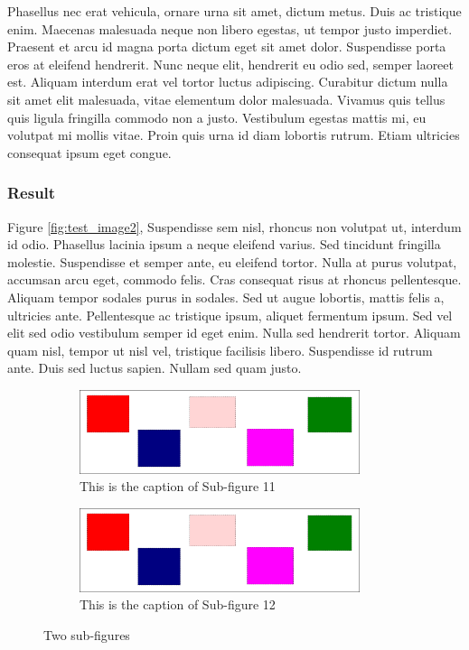Phasellus nec erat vehicula, ornare urna sit amet, dictum metus. Duis ac
tristique enim. Maecenas malesuada neque non libero egestas, ut tempor justo
imperdiet. Praesent et arcu id magna porta dictum eget sit amet dolor.
Suspendisse porta eros at eleifend hendrerit. Nunc neque elit, hendrerit eu
odio sed, semper laoreet est. Aliquam interdum erat vel tortor luctus
adipiscing. Curabitur dictum nulla sit amet elit malesuada, vitae elementum
dolor malesuada. Vivamus quis tellus quis ligula fringilla commodo non a justo.
Vestibulum egestas mattis mi, eu volutpat mi mollis vitae. Proin quis urna id
diam lobortis rutrum. Etiam ultricies consequat ipsum eget congue.

\subsubsection{Result}
Figure \ref{fig:test_image2}, Suspendisse sem nisl, rhoncus non volutpat ut,
interdum id odio. Phasellus lacinia ipsum a neque eleifend varius. Sed
tincidunt fringilla molestie.  Suspendisse et semper ante, eu eleifend tortor.
Nulla at purus volutpat, accumsan arcu eget, commodo felis. Cras consequat
risus at rhoncus pellentesque. Aliquam tempor sodales purus in sodales. Sed ut
augue lobortis, mattis felis a, ultricies ante. Pellentesque ac tristique
ipsum, aliquet fermentum ipsum. Sed vel elit sed odio vestibulum semper id eget
enim. Nulla sed hendrerit tortor. Aliquam quam nisl, tempor ut nisl vel,
tristique facilisis libero. Suspendisse id rutrum ante. Duis sed luctus sapien.
Nullam sed quam justo.
\begin{figure}[h]
    \begin{subfigure}[b]{0.5\linewidth}
        \centering
            \includegraphics[width=0.9\textwidth]{figures/test_image}
            \caption{This is the caption of Sub-figure 11}
            \label{fig:subfig11}
            \end{subfigure}%
        \begin{subfigure}[b]{.5\linewidth}
            \centering
            \includegraphics[width=0.9\textwidth]{figures/test_image}
            \caption{This is the caption of Sub-figure 12}
            \label{fig:subfig12}
        \end{subfigure}
    \caption{Two sub-figures}
\label{fig:sub-figures2}
\end{figure}

